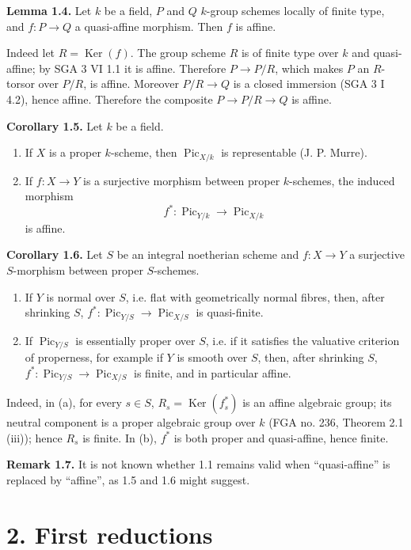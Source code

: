 \documentclass[11pt]{article}
\providecommand{\Pic}{\operatorname{Pic}}
\providecommand{\Ker}{\operatorname{Ker}}
\begin{document}
\textbf{Lemma 1.4.} Let \(k\) be a field, \(P\) and \(Q\) \(k\)-group schemes locally of finite type, and \(f:P\to Q\) a quasi-affine morphism. Then \(f\) is affine.

Indeed let \(R=\Ker(f)\). The group scheme \(R\) is of finite type over \(k\) and quasi-affine; by SGA 3 VI 1.1 it is affine. Therefore \(P\to P/R\), which makes \(P\) an \(R\)-torsor over \(P/R\), is affine. Moreover \(P/R\to Q\) is a closed immersion (SGA 3 I 4.2), hence affine. Therefore the composite \(P\to P/R\to Q\) is affine.

\textbf{Corollary 1.5.} Let \(k\) be a field.
\begin{enumerate}[label=\alph*)]
\item If \(X\) is a proper \(k\)-scheme, then \(\Pic_{X/k}\) is representable (J. P. Murre).
\item If \(f:X\to Y\) is a surjective morphism between proper \(k\)-schemes, the induced morphism
\[
  f^*:\Pic_{Y/k}\longrightarrow \Pic_{X/k}
\]
is affine.
\end{enumerate}

\textbf{Corollary 1.6.} Let \(S\) be an integral noetherian scheme and \(f:X\to Y\) a surjective \(S\)-morphism between proper \(S\)-schemes.
\begin{enumerate}[label=\alph*)]
\item If \(Y\) is normal over \(S\), i.e. flat with geometrically normal fibres, then, after shrinking \(S\), \(f^*:\Pic_{Y/S}\to\Pic_{X/S}\) is quasi-finite.
\item If \(\Pic_{Y/S}\) is essentially proper over \(S\), i.e. if it satisfies the valuative criterion of properness, for example if \(Y\) is smooth over \(S\), then, after shrinking \(S\), \(f^*:\Pic_{Y/S}\to\Pic_{X/S}\) is finite, and in particular affine.
\end{enumerate}
Indeed, in (a), for every \(s\in S\), \(R_s=\Ker(f_s^*)\) is an affine algebraic group; its neutral component is a proper algebraic group over \(k\) (FGA no. 236, Theorem 2.1 (iii)); hence \(R_s\) is finite. In (b), \(f^*\) is both proper and quasi-affine, hence finite.

\textbf{Remark 1.7.} It is not known whether 1.1 remains valid when ``quasi-affine'' is replaced by ``affine'', as 1.5 and 1.6 might suggest.

\section*{2. First reductions}
\end{document}
